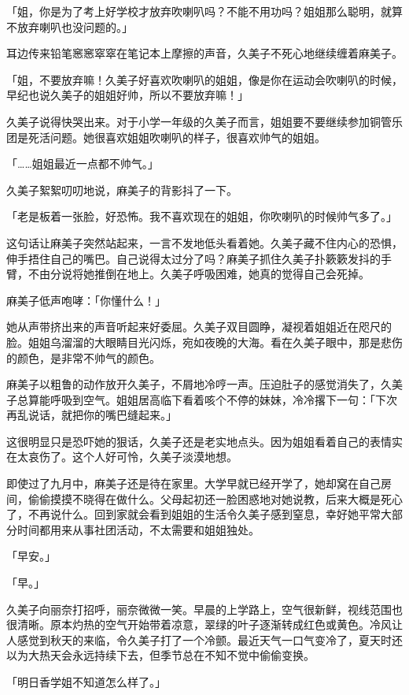 \documentclass[UTF8]{ctexart}
\begin{document}
    「姐，你是为了考上好学校才放弃吹喇叭吗？不能不用功吗？姐姐那么聪明，就算不放弃喇叭也没问题的。」 

    耳边传来铅笔窸窸窣窣在笔记本上摩擦的声音，久美子不死心地继续缠着麻美子。 

    「姐，不要放弃嘛！久美子好喜欢吹喇叭的姐姐，像是你在运动会吹喇叭的时候，早纪也说久美子的姐姐好帅，所以不要放弃嘛！」 

    久美子说得快哭出来。对于小学一年级的久美子而言，姐姐要不要继续参加铜管乐团是死活问题。她很喜欢姐姐吹喇叭的样子，很喜欢帅气的姐姐。 

    「……姐姐最近一点都不帅气。」 

    久美子絮絮叨叨地说，麻美子的背影抖了一下。 

    「老是板着一张脸，好恐怖。我不喜欢现在的姐姐，你吹喇叭的时候帅气多了。」 

    这句话让麻美子突然站起来，一言不发地低头看着她。久美子藏不住内心的恐惧，伸手捂住自己的嘴巴。自己说得太过分了吗？麻美子抓住久美子扑簌簌发抖的手臂，不由分说将她推倒在地上。久美子呼吸困难，她真的觉得自己会死掉。 

    麻美子低声咆哮：「你懂什么！」 

    她从声带挤出来的声音听起来好委屈。久美子双目圆睁，凝视着姐姐近在咫尺的脸。姐姐乌溜溜的大眼睛目光闪烁，宛如夜晚的大海。看在久美子眼中，那是悲伤的颜色，是非常不帅气的颜色。 

    麻美子以粗鲁的动作放开久美子，不屑地冷哼一声。压迫肚子的感觉消失了，久美子总算能呼吸到空气。姐姐居高临下看着咳个不停的妹妹，冷冷撂下一句：「下次再乱说话，就把你的嘴巴缝起来。」 

    这很明显只是恐吓她的狠话，久美子还是老实地点头。因为姐姐看着自己的表情实在太哀伤了。这个人好可怜，久美子淡漠地想。 

    即使过了九月中，麻美子还是待在家里。大学早就已经开学了，她却窝在自己房间，偷偷摸摸不晓得在做什么。父母起初还一脸困惑地对她说教，后来大概是死心了，不再说什么。回到家就会看到姐姐的生活令久美子感到窒息，幸好她平常大部分时间都用来从事社团活动，不太需要和姐姐独处。 

    「早安。」 

    「早。」 

    久美子向丽奈打招呼，丽奈微微一笑。早晨的上学路上，空气很新鲜，视线范围也很清晰。原本灼热的空气开始带着凉意，翠绿的叶子逐渐转成红色或黄色。冷风让人感觉到秋天的来临，令久美子打了一个冷颤。最近天气一口气变冷了，夏天时还以为大热天会永远持续下去，但季节总在不知不觉中偷偷变换。 

    「明日香学姐不知道怎么样了。」 
\end{document}
